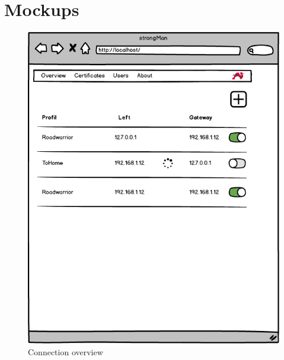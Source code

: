 \chapter{Mockups}
\label{Mockups}
\begin{figure}[H]
	\centering
	\includegraphics[width=400pt]{images/mockups/con_overview.png}
	\caption{Connection overview}
\end{figure}


